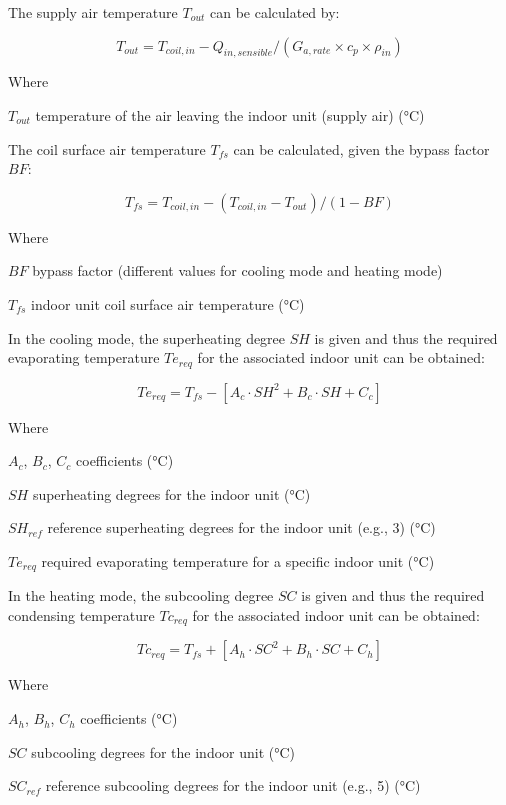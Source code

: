 The supply air temperature $T_{out}$ can be calculated by:

\begin{equation}
  T_{out} = T_{coil,in} - Q_{in, sensible} / (G_{a,rate}\times{c_p}\times\rho_{in})
\end{equation}

Where

$T_{out}$	temperature of the air leaving the indoor unit (supply air) (°C)

The coil surface air temperature $T_{fs}$ can be calculated, given the bypass factor $BF$:

\begin{equation}
  T_{fs}= T_{coil,in} - (T_{coil,in}-T_{out}) / (1-BF)
\end{equation}

Where

$BF$ bypass factor (different values for cooling mode and heating mode) 

$T_{fs}$ indoor unit coil surface air temperature (°C)

In the cooling mode, the superheating degree $SH$ is given and thus the required evaporating temperature $Te_{req}$ for the associated indoor unit can be obtained:

\begin{equation}
  Te_{req}=T_{fs}-[A_c\cdot SH^2+B_c\cdot SH+C_c]
\end{equation}
 
Where

$A_c$, $B_c$, $C_c$ coefficients (°C)

$SH$ superheating degrees for the indoor unit (°C) 

$SH_{ref}$ reference superheating degrees for the indoor unit (e.g., 3) (°C)

$Te_{req}$ required evaporating temperature for a specific indoor unit (°C)

In the heating mode, the subcooling degree $SC$ is given and thus the required condensing temperature $Tc_{req}$ for the associated indoor unit can be obtained:

\begin{equation}
  Tc_{req}=T_{fs}+[A_h\cdot SC^2+B_h\cdot SC+C_h]
\end{equation}
 
Where

$A_h$, $B_h$, $C_h$ coefficients (°C)

$SC$ subcooling degrees for the indoor unit (°C) 

$SC_{ref}$ reference subcooling degrees for the indoor unit (e.g., 5) (°C)

